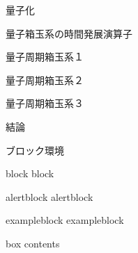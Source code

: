 \documentclass[aspectratio=169, dvipdfmx, 11pt]{beamer} %
\begin{document}
\begin{frame}{量子化}
\end{frame}

\begin{frame}{量子箱玉系の時間発展演算子}
\end{frame}

\begin{frame}{量子周期箱玉系１}
\end{frame}

\begin{frame}{量子周期箱玉系２}
\end{frame}

\begin{frame}{量子周期箱玉系３}
\end{frame}

\begin{frame}{結論}
\end{frame}












\begin{frame}{ブロック環境}
    \begin{block}{block}
    block
    \end{block}
    \begin{alertblock}{alertblock}
    alertblock
    \end{alertblock}
    \begin{exampleblock}{exampleblock}
    exampleblock
    \end{exampleblock}
    \begin{tcolorbox}[colframe=green,
    colback=green!10!white,
    colbacktitle=green!40!white,
    coltitle=black, fonttitle=\bfseries,
    title=My box]
        box contents
    \end{tcolorbox}
\end{frame}
\end{document}
